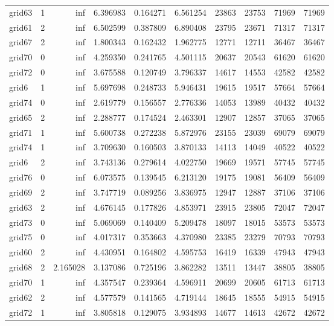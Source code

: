 \begin{longtable}{|l|r|r|r|r|r|r|r|r|r|}
grid63 & 1 & inf & 6.396983 & 0.164271 & 6.561254 & 23863 & 23753 & 71969 & 71969 \\
grid61 & 2 & inf & 6.502599 & 0.387809 & 6.890408 & 23795 & 23671 & 71317 & 71317 \\
grid67 & 2 & inf & 1.800343 & 0.162432 & 1.962775 & 12771 & 12711 & 36467 & 36467 \\
grid70 & 0 & inf & 4.259350 & 0.241765 & 4.501115 & 20637 & 20543 & 61620 & 61620 \\
grid72 & 0 & inf & 3.675588 & 0.120749 & 3.796337 & 14617 & 14553 & 42582 & 42582 \\
grid6 & 1 & inf & 5.697698 & 0.248733 & 5.946431 & 19615 & 19517 & 57664 & 57664 \\
grid74 & 0 & inf & 2.619779 & 0.156557 & 2.776336 & 14053 & 13989 & 40432 & 40432 \\
grid65 & 2 & inf & 2.288777 & 0.174524 & 2.463301 & 12907 & 12857 & 37065 & 37065 \\
grid71 & 1 & inf & 5.600738 & 0.272238 & 5.872976 & 23155 & 23039 & 69079 & 69079 \\
grid74 & 1 & inf & 3.709630 & 0.160503 & 3.870133 & 14113 & 14049 & 40522 & 40522 \\
grid6 & 2 & inf & 3.743136 & 0.279614 & 4.022750 & 19669 & 19571 & 57745 & 57745 \\
grid76 & 0 & inf & 6.073575 & 0.139545 & 6.213120 & 19175 & 19081 & 56409 & 56409 \\
grid69 & 2 & inf & 3.747719 & 0.089256 & 3.836975 & 12947 & 12887 & 37106 & 37106 \\
grid63 & 2 & inf & 4.676145 & 0.177826 & 4.853971 & 23915 & 23805 & 72047 & 72047 \\
grid73 & 0 & inf & 5.069069 & 0.140409 & 5.209478 & 18097 & 18015 & 53573 & 53573 \\
grid75 & 0 & inf & 4.017317 & 0.353663 & 4.370980 & 23385 & 23279 & 70793 & 70793 \\
grid60 & 2 & inf & 4.430951 & 0.164802 & 4.595753 & 16419 & 16339 & 47943 & 47943 \\
grid68 & 2 & 2.165028 & 3.137086 & 0.725196 & 3.862282 & 13511 & 13447 & 38805 & 38805 \\
grid70 & 1 & inf & 4.357547 & 0.239364 & 4.596911 & 20699 & 20605 & 61713 & 61713 \\
grid62 & 2 & inf & 4.577579 & 0.141565 & 4.719144 & 18645 & 18555 & 54915 & 54915 \\
grid72 & 1 & inf & 3.805818 & 0.129075 & 3.934893 & 14677 & 14613 & 42672 & 42672 \\

\end{longtable}
